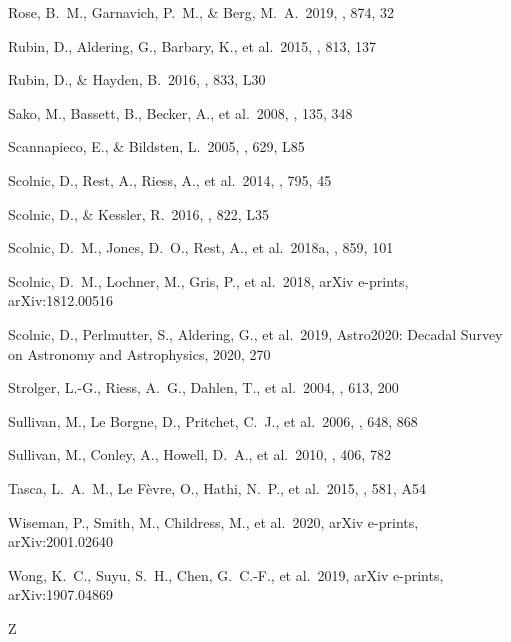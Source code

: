\documentclass[]{aa} %
\begin{document}
\begin{thebibliography}{}
 Rose, B.~M., Garnavich, P.~M., \& Berg, M.~A.\ 2019, \apj, 874, 32


 Rubin, D., Aldering, G., Barbary, K., et al.\ 2015, \apj, 813, 137

 Rubin, D., \& Hayden, B.\ 2016, \apjl, 833, L30


 Sako, M., Bassett, B., Becker, A., et al.\ 2008, \aj, 135, 348

 Scannapieco, E., \& Bildsten, L.\ 2005, \apjl, 629, L85 

 Scolnic, D., Rest, A., Riess, A., et al.\ 2014, \apj, 795, 45

 Scolnic, D., \& Kessler, R.\ 2016, \apjl, 822, L35


 Scolnic, D.~M., Jones, D.~O., Rest, A., et al.\ 2018a, \apj, 859, 101

 Scolnic, D.~M., Lochner, M., Gris, P., et al.\ 2018, arXiv e-prints, arXiv:1812.00516

 Scolnic, D., Perlmutter, S., Aldering, G., et al.\ 2019, Astro2020: Decadal Survey on Astronomy and Astrophysics, 2020, 270

 Strolger, L.-G., Riess, A.~G., Dahlen, T., et al.\ 2004, \apj, 613, 200

 Sullivan, M., Le  Borgne, D., Pritchet, C.~J., et al.\ 2006, \apj, 648, 868 


 Sullivan, M., Conley, A., Howell, D.~A., et al.\ 2010, \mnras, 406, 782

 Tasca, L.~A.~M., Le F{\`e}vre, O., Hathi, N.~P., et al.\ 2015, \aap, 581, A54

 Wiseman, P., Smith, M., Childress, M., et al.\ 2020, arXiv e-prints, arXiv:2001.02640


 Wong, K.~C., Suyu, S.~H., Chen, G.~C.-F., et al.\ 2019, arXiv e-prints, arXiv:1907.04869

 Z
\end{thebibliography}
\end{document}
